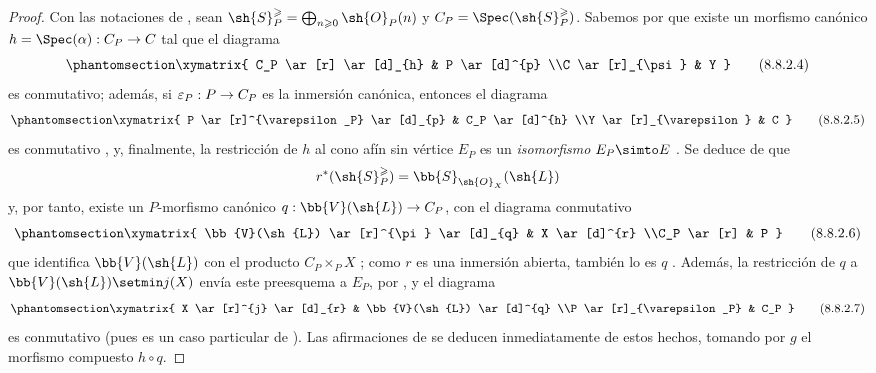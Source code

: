 \documentclass[oneside,10pt]{amsart}
\makeatletter
\renewcommand{\geq}{\geqslant}
\newcommand{\ega@arrow}[2]{\mathchoice{#1}{#2}{#2}{#2}}
\renewcommand{\to}{\ega@arrow{\longrightarrow}{\rightarrow}}
\newcommand{\oldpage}[2][]{\marginnote{\normalfont\footnotesize\textbf{#1}~|~#2}\ignorespaces}
\let\EGAOriginalLabel\label
\renewcommand{\label}[1]{\phantomsection\EGAOriginalLabel{#1}}
\newcommand*{\ega@labelnumber}[1]{\StrBehind{#1}{.}}
\newcommand{\eref}[1]{\hyperref[#1]{\normalfont{(\ega@labelnumber{#1})}}}
\makeatother
\begin{document}
\begin{proof}
Con las notaciones de , sean $\sh{S}_P^\geq = \bigoplus_{n\geq0}\sh{O}_P(n)$ y $C_P=\Spec(\sh{S}_P^\geq)$.
Sabemos por  que existe un morfismo canónico $h=\Spec(\alpha):C_P\to C$ tal que el diagrama
\[
\label{II.8.8.2.4}
  \xymatrix{
    C_P
      \ar[r]
      \ar[d]_{h}
  & P
      \ar[d]^{p}
  \\C
      \ar[r]_{\psi}
  & Y
  }
\tag{8.8.2.4}
\]
es conmutativo; además, si $\varepsilon_P:P\to C_P$ es la inmersión canónica, entonces el diagrama
\[
\label{II.8.8.2.5}
  \xymatrix{
    P
      \ar[r]^{\varepsilon_P}
      \ar[d]_{p}
  & C_P
      \ar[d]^{h}
  \\Y
      \ar[r]_{\varepsilon}
  & C
  }
\tag{8.8.2.5}
\]
es conmutativo , y, finalmente, la restricción de $h$ al cono afín sin vértice $E_P$ es un \emph{isomorfismo} $E_P\simto E$ .
Se deduce de  que
\[
  r^*(\sh{S}_P^\geq)=\bb{S}_{\sh{O}_X}(\sh{L})
\]
\oldpage[II]{179}
y, por tanto, existe un $P$-morfismo canónico $q:\bb{V}(\sh{L})\to C_P$, con el diagrama conmutativo
\[
\label{II.8.8.2.6}
  \xymatrix{
    \bb{V}(\sh{L})
      \ar[r]^{\pi}
      \ar[d]_{q}
  & X
      \ar[d]^{r}
  \\C_P
      \ar[r]
  & P
  }
\tag{8.8.2.6}
\]
que identifica $\bb{V}(\sh{L})$ con el producto $C_P\times_P X$ ;
como $r$ es una inmersión abierta, también lo es $q$ .
Además, la restricción de $q$ a $\bb{V}(\sh{L})\setmin j(X)$ envía este preesquema a $E_P$, por , y el diagrama
\[
\label{II.8.8.2.7}
  \xymatrix{
    X
      \ar[r]^{j}
      \ar[d]_{r}
  & \bb{V}(\sh{L})
      \ar[d]^{q}
  \\P
      \ar[r]_{\varepsilon_P}
  & C_P
  }
\tag{8.8.2.7}
\]
es conmutativo (pues es un caso particular de \eref{eq:2.8.5.1.3}).
Las afirmaciones de  se deducen inmediatamente de estos hechos, tomando por $g$ el morfismo compuesto $h\circ q$.
\end{proof}
\end{document}
